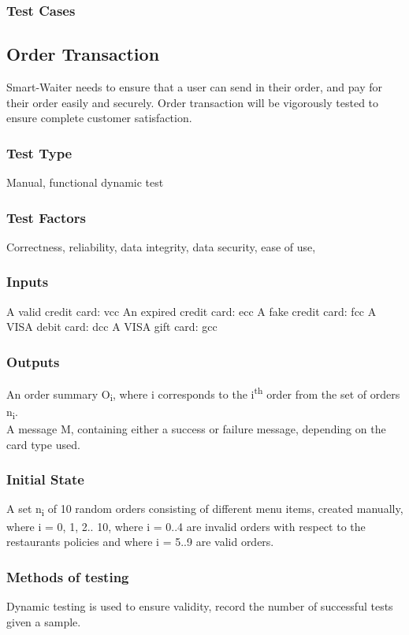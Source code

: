\documentclass[12pt]{article}
\begin{document}
\subsubsection{Test Cases}

\subsection{Order Transaction}
Smart-Waiter needs to ensure that a user can send in their order, and pay for their order easily and securely. Order transaction will be vigorously tested to ensure complete customer satisfaction.  
\subsubsection{Test Type}
Manual, functional dynamic test 
\subsubsection{Test Factors}
Correctness, reliability, data integrity, data security, ease of use, 
\subsubsection{Inputs}
A valid credit card: vcc
An expired credit card: ecc
A fake credit card: fcc
A VISA debit card: dcc
A VISA gift card: gcc
\subsubsection{Outputs}
An order summary \texorpdfstring{O\textsubscript{i}}{Oi}, where i corresponds to the \texorpdfstring{i\textsuperscript{th}}{ith} order from the set of orders \texorpdfstring{n\textsubscript{i}}{ni}. \\
A message M, containing either a success or failure message, depending on the card type used. 
\subsubsection{Initial State}
A set \texorpdfstring{n\textsubscript{i}}{ni} of 10 random orders consisting of different menu items, created manually, where i = 0, 1, 2.. 10, where i = 0..4 are invalid orders with respect to the restaurants policies and where i = 5..9 are valid orders.
\subsubsection{Methods of testing}
Dynamic testing is used to ensure validity, record the number of successful tests given a sample.
\end{document}
